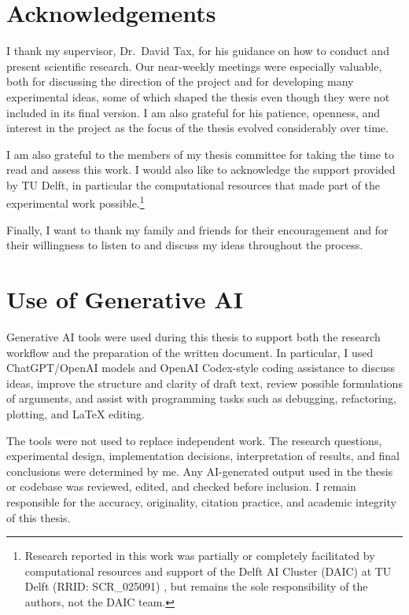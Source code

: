 \documentclass[11pt,a4paper]{report}
\begin{document}
\chapter*{Acknowledgements}

I thank my supervisor, Dr.~David Tax, for his guidance on how to conduct and present scientific research. Our near-weekly meetings were especially valuable, both for discussing the direction of the project and for developing many experimental ideas, some of which shaped the thesis even though they were not included in its final version. I am also grateful for his patience, openness, and interest in the project as the focus of the thesis evolved considerably over time.

I am also grateful to the members of my thesis committee for taking the time to read and
assess this work. I would also like to acknowledge the support provided by TU Delft, in particular the computational resources that made part of the experimental work possible.\footnote{Research reported in this work was partially or completely facilitated by computational resources and support of the Delft AI Cluster (DAIC) at TU Delft (RRID: SCR\_025091) \citet{DAIC}, but remains the sole responsibility of the authors, not the DAIC team.} 

Finally, I want to thank my family and friends for their encouragement and for their willingness to listen to and discuss my ideas throughout the process.

\chapter*{Use of Generative AI}

Generative AI tools were used during this thesis to support both the research
workflow and the preparation of the written document. In particular,
I used ChatGPT/OpenAI models and OpenAI Codex-style coding assistance to discuss
ideas, improve the structure and clarity of draft text, review possible
formulations of arguments, and assist with programming tasks such as debugging,
refactoring, plotting, and \LaTeX{} editing.

The tools were not used to replace independent work. The research
questions, experimental design, implementation decisions, interpretation of
results, and final conclusions were determined by me. Any AI-generated output
used in the thesis or codebase was reviewed, edited, and checked before
inclusion. I remain responsible for the accuracy, originality, citation practice,
and academic integrity of this thesis.
\end{document}
